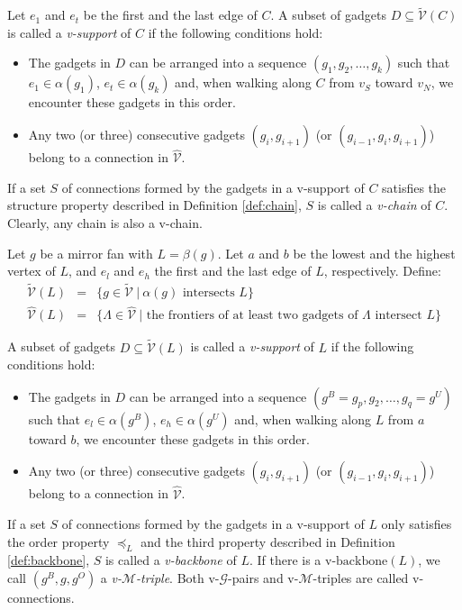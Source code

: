 \documentclass[11pt]{article}
\newcommand{\MM}{\mathcal{M}}
\newcommand{\GG}{\mathcal{G}}
\newcommand{\VV}{\mathcal{V}}
\begin{document}
Let $e_1$ and $e_t$ be the first and the last edge of $C$.
A subset of gadgets $D \subseteq \tilde{\VV}(C)$
is called a {\em v-support} of $C$ if the following conditions hold:
\begin{itemize}
\item The gadgets in $D$ can be arranged into a sequence $(g_1,g_2,\ldots, g_k)$
such that
$e_1 \in \alpha(g_1)$, $e_t \in \alpha(g_k)$ and, when walking along
$C$ from $v_S$ toward $v_N$, we encounter these gadgets in this order.

\item Any two (or three) consecutive gadgets $(g_i,g_{i+1})$
(or $(g_{i-1},g_i,g_{i+1})$) belong to a connection in $\hat{\VV}$.
\end{itemize}

If a set $S$ of connections formed by the gadgets in a v-support of $C$
satisfies the structure property described in Definition \ref{def:chain},
$S$ is called a {\em v-chain} of $C$.  Clearly, any chain is also a
v-chain.

Let $g$ be a mirror fan with $L=\beta(g)$. Let $a$ and $b$ be
the lowest and the highest vertex of $L$, and $e_l$ and $e_h$
the first and the last edge of $L$, respectively. Define:
\begin{eqnarray*}
\tilde{\VV}(L) &=&
\{ g \in \tilde{\VV}~|~\alpha(g) \mbox{ intersects } L\}\\
\hat{\VV}(L) & = &
\{ \Lambda \in \hat{\VV}~|\mbox{ the frontiers of at least two gadgets of }\Lambda
\mbox{ intersect } L\}
\end{eqnarray*}

A subset of gadgets $D \subseteq \tilde{\VV}(L)$
is called a {\em v-support} of $L$ if the following conditions hold:
\begin{itemize}
\item The gadgets in $D$ can be arranged into a sequence $(g^B=g_p,g_2,\ldots,
g_q=g^U)$ such that
$e_l\in\alpha(g^B)$, $e_h \in \alpha(g^U)$ and, when walking along $L$
from $a$ toward $b$, we encounter these gadgets in this order.

\item Any two (or three) consecutive gadgets $(g_i,g_{i+1})$
(or $(g_{i-1},g_i,g_{i+1})$) belong to a connection in $\hat{\VV}$.
\end{itemize}

If a set $S$ of connections formed by the gadgets in a v-support of $L$
only satisfies the order property $\preceq_L$ and
the third property described in Definition \ref{def:backbone},
$S$ is called a {\em v-backbone} of $L$. If there is a
v-$\mbox{backbone}(L)$, we call $(g^B,g,g^O)$ a {\em v-$\MM$-triple}.
Both v-$\GG$-pairs and v-$\MM$-triples are called v-connections.
\end{document}
